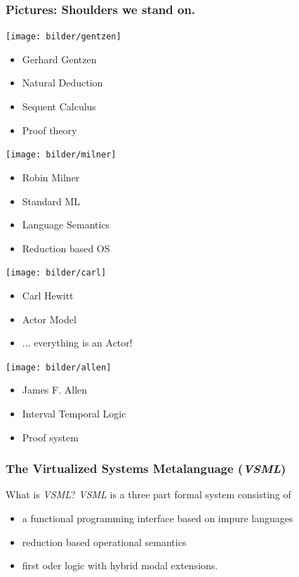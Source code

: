 \documentclass[aspectratio=169] {beamer}
\begin{document}
\begin{frame}\frametitle{Pictures: Shoulders we stand on.}
	\small
	\begin{minipage}{3cm}
		\centering
 		\texttt{[image: bilder/gentzen]}
 		\begin{itemize}
 			\item Gerhard Gentzen
 			\item Natural Deduction
 			\item Sequent Calculus
 			\item Proof theory
 		\end{itemize}
	\end{minipage}
	\hfill
	\begin{minipage}{3cm}
		\centering
 		\texttt{[image: bilder/milner]}
 		\begin{itemize}
 			\item Robin Milner
 			\item Standard ML
 			\item Language Semantics
 			\item Reduction based OS
 		\end{itemize}
	\end{minipage}
	\hfill
	\begin{minipage}{3cm}
		\centering
 		\texttt{[image: bilder/carl]}
 		\begin{itemize}
 			\item Carl Hewitt
 			\item Actor Model
 			\item ... everything is an Actor!
 		\end{itemize}
	\end{minipage}
	\hfill
	\begin{minipage}{3cm}
		\centering
 		\texttt{[image: bilder/allen]}
 		\begin{itemize}
 			\item James F. Allen
 			\item Interval Temporal Logic
 			\item Proof system
 		\end{itemize}
	\end{minipage}
\end{frame}

\begin{frame}\frametitle{The Virtualized Systems Metalanguage (\emph{VSML})}
	What is \emph{VSML}?
	\vfill
	\emph{VSML} is a three part formal system consisting of 
	\begin{itemize}
		\item a functional programming interface based on impure languages
		\item reduction based operational semantics
		\item first oder logic with hybrid modal extensions.
	\end{itemize}
\end{frame}
\end{document}
